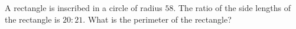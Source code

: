 A rectangle is inscribed in a circle of radius $58$. The ratio of the side lengths of the rectangle is $20:21$. What is the perimeter of the rectangle?
